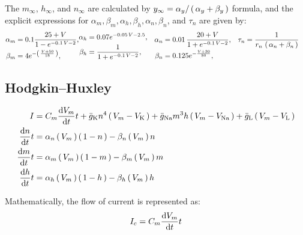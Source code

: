 \documentclass[../../Orator.tex]{subfiles}
\begin{document}
The \(m_\infty\), \(h_\infty\), and \(n_\infty\) are calculated by \(y_\infty = \alpha_y / \br{\alpha_y + \beta_y} \) formula, and the explicit expressions for 
\(\alpha_m, \beta_m, \alpha_h, \beta_h, \alpha_n, \beta_n\), and \(\tau_n\) are given by:
{
\begin{align*}
    \begin{split}
        \alpha_m &= 0.1 \frac{ 25 + V }{1 - e^{-0.1 \, V - 2}}, \\
        \beta_m  &= 4 e^{-\br{\frac{ V + 50 }{ 18 } } }, 
    \end{split} &
    \begin{split}
        \alpha_h &=  0.07 e^{-0.05\,V -2.5}, \\
        \beta_h  &= \frac{ 1 }{ 1 + e^{-0.1 \, V - 2}},
    \end{split} &
    \begin{split}
        \alpha_n &= 0.01 \, \frac{ 20 + V }{ 1 + e^{-0.1 \, V - 2}}, \\
        \beta_n  &= 0.125 e^{- \frac{V + 30}{80}},
    \end{split} &
    \begin{split}
    \tau_n &= \frac{1}{ r_n \, \br{\alpha_n + \beta_n} } \\
    \phantom{fart}
    \end{split}
\end{align*}
}




\subsection{Hodgkin–Huxley}
\begin{subequations}\label{eq:HodHuxSys}
    \begin{align}
        I &= C_m \ode{V_m}{t} + \bar{g}_\rmm{K} n^4 \br{V_m - V_\rmm{K}} + \bar{g}_\rmm{Na} m^3 h \br{V_m - V_\rmm{Na}}  + \bar{g}_\rmm{L} \br{V_m - V_\rmm{L}} \\
        \ode{n}{t} &= \alpha_n \br{V_m} \br{1-n} - \beta_n \br{V_m} n \\
        \ode{m}{t} &= \alpha_m \br{V_m} \br{1-m} - \beta_m \br{V_m} m \\
        \ode{h}{t} &= \alpha_h \br{V_m} \br{1-h} - \beta_h \br{V_m} h 
    \end{align}
\end{subequations}

Mathematically, the flow of current is represented as:
\begin{equation}
    I_c = C_m \ode{V_m}{t}
\end{equation}
\end{document}
